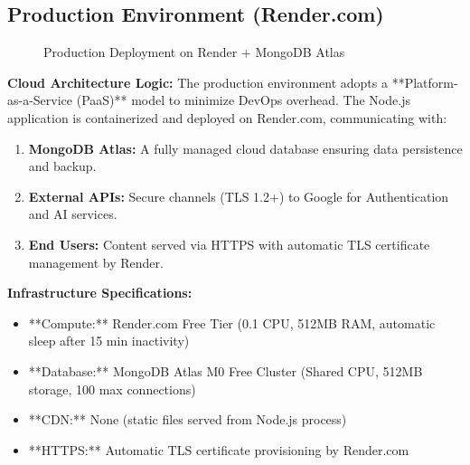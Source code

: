\documentclass[12pt, a4paper]{report}
\begin{document}
\subsection{Production Environment (Render.com)}

\begin{figure}[H]
\centering
{}
\caption{Production Deployment on Render + MongoDB Atlas}
\label{fig:prod_deployment}
\end{figure}

\textbf{Cloud Architecture Logic:}
The production environment adopts a **Platform-as-a-Service (PaaS)** model to minimize DevOps overhead. The Node.js application is containerized and deployed on Render.com, communicating with:
\begin{enumerate}
    \item \textbf{MongoDB Atlas:} A fully managed cloud database ensuring data persistence and backup.
    \item \textbf{External APIs:} Secure channels (TLS 1.2+) to Google for Authentication and AI services.
    \item \textbf{End Users:} Content served via HTTPS with automatic TLS certificate management by Render.
\end{enumerate}

\textbf{Infrastructure Specifications:}
\begin{itemize}
    \item **Compute:** Render.com Free Tier (0.1 CPU, 512MB RAM, automatic sleep after 15 min inactivity)
    \item **Database:** MongoDB Atlas M0 Free Cluster (Shared CPU, 512MB storage, 100 max connections)
    \item **CDN:** None (static files served from Node.js process)
    \item **HTTPS:** Automatic TLS certificate provisioning by Render.com
\end{itemize}
\end{document}
